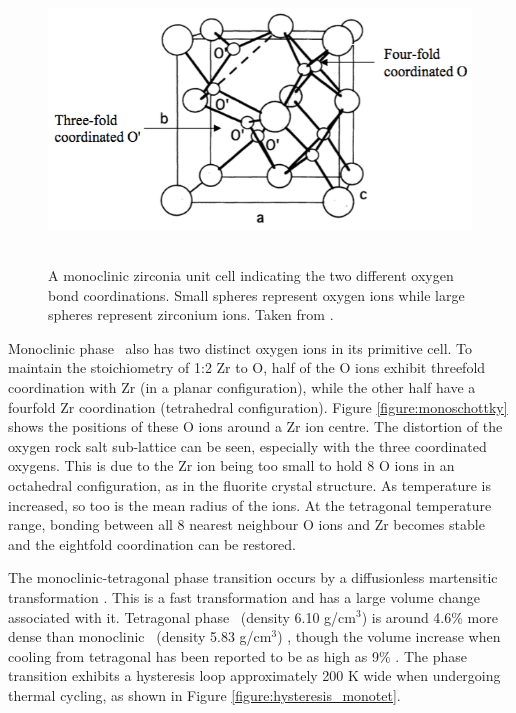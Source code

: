\begin{figure}[htp] %
\centering
\includegraphics[height=7.5cm]{images/coordination.png}
\caption[A monoclinic zirconia unit cell indicating the two different oxygen bond coordinations. Small spheres represent oxygen ions while large spheres represent zirconium ions.]{A monoclinic zirconia unit cell indicating the two different oxygen bond coordinations. Small spheres represent oxygen ions while large spheres represent zirconium ions. Taken from \cite{Xia2010}.
\label{figure:coordination}}
\end{figure}

Monoclinic phase \zirconia\ also has two distinct oxygen ions in its primitive cell. To maintain the stoichiometry of 1:2 Zr to O, half of the O ions exhibit threefold coordination with Zr (in a planar configuration), while the other half have a fourfold Zr coordination (tetrahedral configuration). Figure \ref{figure:monoschottky} shows the positions of these O ions around a Zr ion centre. The distortion of the oxygen rock salt sub-lattice can be seen, especially with the three coordinated oxygens. This is due to the Zr ion being too small to hold 8 O ions in an octahedral configuration, as in the fluorite crystal structure. As temperature is increased, so too is the mean radius of the ions. At the tetragonal temperature range, bonding between all 8 nearest neighbour O ions and Zr becomes stable and the eightfold coordination can be restored. 

The monoclinic-tetragonal phase transition occurs by a diffusionless martensitic transformation \cite{Subbarao1974}. This is a fast transformation and has a large volume change associated with it. Tetragonal phase \zirconia\ (density 6.10 g/cm$^{3}$) is around 4.6\% more dense than monoclinic \zirconia\ (density 5.83 g/cm$^{3}$) \cite{McCullough2002}, though the volume increase when cooling from tetragonal has been reported to be as high as 9\% \cite{Gupta1977}. The phase transition exhibits a hysteresis loop approximately 200 K wide when undergoing thermal cycling, as shown in Figure \ref{figure:hysteresis_monotet}.

